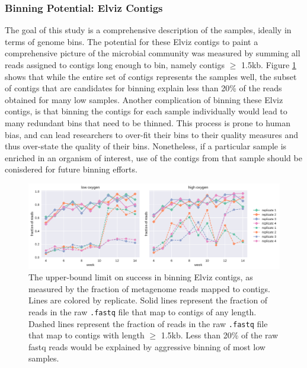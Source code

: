 \subsubsection{Binning Potential: Elviz Contigs}    %

The goal of this study is a comprehensive description of the samples, ideally in terms of genome bins.
The potential for these Elviz contigs to paint a comprehensive picture of the microbial community was measured by summing all reads assigned to contigs long enough to bin, namely contigs $\geq$ 1.5kb.
Figure \ref{fig:dont_bin_Elviz} shows that while the entire set of contigs represents the samples well, the subset of contigs that are candidates for binning explain less than 20\% of the reads obtained for many low  samples.
Another complication of binning these Elviz contigs, is that binning the contigs for each sample individually would lead to many redundant bins that need to be thinned.
This process is prone to human bias, and can lead researchers to over-fit their bins to their quality measures and thus over-state the quality of their bins.
Nonetheless, if a particular sample is enriched in an organism of interest, use of the contigs from that sample should be conisdered for future binning efforts.


\begin{figure}[H]
\centering
    \includegraphics[width=1.0\textwidth]{./tex/chapter2/figures/170314_Elviz_is_not_for_binning--landscape.pdf}  %
    \begin{singlespace}
    \caption[Upper-bound limit on success of binning Elviz contigs]{
        The upper-bound limit on success in binning Elviz contigs, as measured by the fraction of metagenome reads mapped to contigs.
        Lines are colored by replicate.
        Solid lines represent the fraction of reads in the raw \texttt{.fastq} file that map to contigs of any length.
        Dashed lines represent the fraction of reads in the raw \texttt{.fastq} file that map to contigs with length $\geq$ 1.5kb.
        Less than 20\% of the raw fastq reads would be explained by aggressive binning of most low  samples.}
    \label{fig:dont_bin_Elviz}
    \end{singlespace}
\end{figure}

